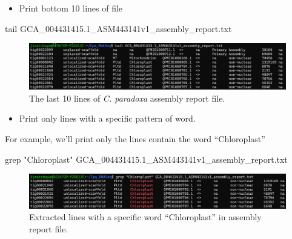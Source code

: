 \documentclass[
  letterpaper,
  DIV=11,
  numbers=noendperiod]{scrreprt}
\newenvironment{Shaded}{\begin{snugshade}}{\end{snugshade}}
\newcommand{\FunctionTok}[1]{\textcolor[rgb]{0.28,0.35,0.67}{#1}}
\newcommand{\NormalTok}[1]{\textcolor[rgb]{0.00,0.23,0.31}{#1}}
\newcommand{\StringTok}[1]{\textcolor[rgb]{0.13,0.47,0.30}{#1}}
\providecommand{\tightlist}{%
  \setlength{\itemsep}{0pt}\setlength{\parskip}{0pt}}\usepackage{longtable,booktabs,array}
\begin{document}
\begin{itemize}
\tightlist
\item
  Print bottom 10 lines of file
\end{itemize}

\begin{Shaded}
\begin{Highlighting}[]
\FunctionTok{tail}\NormalTok{ GCA\_004431415.1\_ASM443141v1\_assembly\_report.txt}
\end{Highlighting}
\end{Shaded}

\begin{figure}

{\centering \includegraphics[width=1\textwidth,height=\textheight]{./assets/08_tail_file.png}

}

\caption{The last 10 lines of \emph{C. paradoxa} assembly report file.}

\end{figure}

\begin{itemize}
\tightlist
\item
  Print only lines with a specific pattern of word.
\end{itemize}

For example, we'll print only the lines contain the word ``Chloroplast''

\begin{Shaded}
\begin{Highlighting}[]
\FunctionTok{grep} \StringTok{"Chloroplast"}\NormalTok{ GCA\_004431415.1\_ASM443141v1\_assembly\_report.txt}
\end{Highlighting}
\end{Shaded}

\begin{figure}

{\centering \includegraphics{./assets/09_grep_file.png}

}

\caption{Extracted lines with a specific word ``Chloroplast'' in
assembly report file.}

\end{figure}
\end{document}

